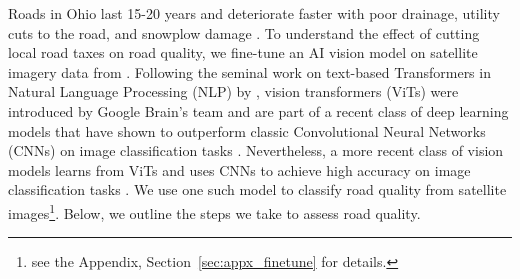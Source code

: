 Roads in Ohio last 15-20 years and deteriorate faster with poor drainage, utility cuts to the road, and snowplow damage \citep{hudson2020faq}. 
To understand the effect of cutting local road taxes on road quality, we fine-tune an AI vision model on satellite imagery data from \cite{brewer2021}. Following the seminal work on text-based Transformers in Natural Language Processing (NLP) by \cite{vaswani2017attention}, vision transformers (ViTs) were introduced by Google Brain's team and are part of a recent class of deep learning models that have shown to outperform classic Convolutional Neural Networks (CNNs) on image classification tasks \citep{dosovitskiy2020image}. Nevertheless, a more recent class of vision models learns from ViTs and uses CNNs to achieve high accuracy on image classification tasks \citep{woo2023convnext}. We use one such model to classify road quality from satellite images\footnote{see the Appendix, Section~\ref{sec:appx_finetune} for details.}. Below, we outline the steps we take to assess road quality.



